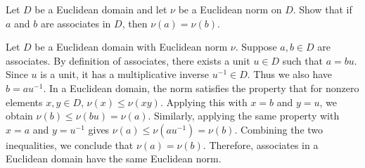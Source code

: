 \begin{problem}[35.15]
  Let $D$ be a Euclidean domain and let $\nu$ be a Euclidean norm on $D$. Show that if $a$ and $b$ are associates in $D$, then $\nu(a) = \nu(b)$.
\end{problem}

\begin{solution}
  Let $D$ be a Euclidean domain with Euclidean norm $\nu$. Suppose $a,b \in D$ are associates. By definition of associates, there exists a unit $u \in D$ such that $a = bu$. Since $u$ is a unit, it has a multiplicative inverse $u^{-1} \in D$. Thus we also have $b = au^{-1}$. In a Euclidean domain, the norm satisfies the property that for nonzero elements $x,y \in D$, $\nu(x) \le \nu(xy)$. Applying this with $x = b$ and $y = u$, we obtain $\nu(b) \le \nu(bu) = \nu(a)$. Similarly, applying the same property with $x = a$ and $y = u^{-1}$ gives $\nu(a) \le \nu(au^{-1}) = \nu(b)$. Combining the two inequalities, we conclude that $\nu(a) = \nu(b)$. Therefore, associates in a Euclidean domain have the same Euclidean norm.
\end{solution}

